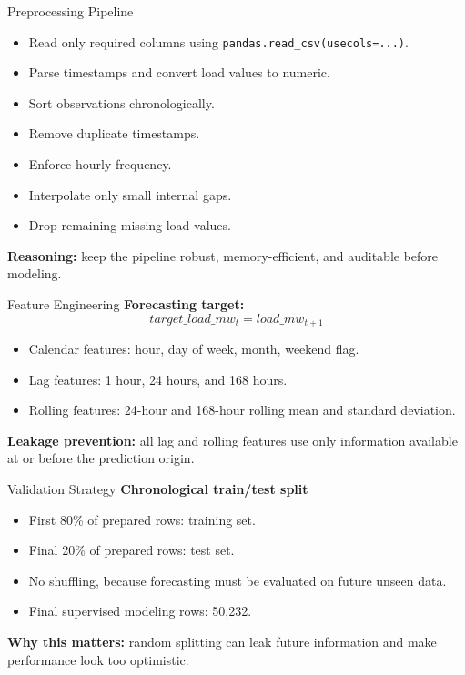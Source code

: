 \documentclass[aspectratio=169]{beamer}
\begin{document}
\begin{frame}{Preprocessing Pipeline}
    \begin{itemize}
        \item Read only required columns using \texttt{pandas.read\_csv(usecols=...)}.
        \item Parse timestamps and convert load values to numeric.
        \item Sort observations chronologically.
        \item Remove duplicate timestamps.
        \item Enforce hourly frequency.
        \item Interpolate only small internal gaps.
        \item Drop remaining missing load values.
    \end{itemize}

    \vspace{0.4cm}
    \textbf{Reasoning:} keep the pipeline robust, memory-efficient, and auditable before modeling.
\end{frame}

\begin{frame}{Feature Engineering}
    \textbf{Forecasting target:}
    \[
        target\_load\_mw_t = load\_mw_{t+1}
    \]

    \vspace{0.2cm}
    \begin{itemize}
        \item Calendar features: hour, day of week, month, weekend flag.
        \item Lag features: 1 hour, 24 hours, and 168 hours.
        \item Rolling features: 24-hour and 168-hour rolling mean and standard deviation.
    \end{itemize}

    \vspace{0.4cm}
    \textbf{Leakage prevention:}
    all lag and rolling features use only information available at or before the prediction origin.
\end{frame}

\begin{frame}{Validation Strategy}
    \textbf{Chronological train/test split}

    \vspace{0.3cm}
    \begin{itemize}
        \item First 80\% of prepared rows: training set.
        \item Final 20\% of prepared rows: test set.
        \item No shuffling, because forecasting must be evaluated on future unseen data.
        \item Final supervised modeling rows: 50,232.
    \end{itemize}

    \vspace{0.4cm}
    \textbf{Why this matters:} random splitting can leak future information and make performance look too optimistic.
\end{frame}
\end{document}
